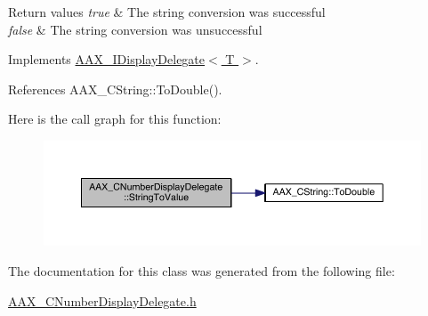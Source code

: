 \begin{DoxyRetVals}{Return values}
{\em true} & The string conversion was successful \\
\hline
{\em false} & The string conversion was unsuccessful \\
\hline
\end{DoxyRetVals}


Implements \hyperlink{a00092_aed5224775c9f733f091afddfba057d5e}{A\+A\+X\+\_\+\+I\+Display\+Delegate$<$ T $>$}.



References A\+A\+X\+\_\+\+C\+String\+::\+To\+Double().



Here is the call graph for this function\+:
\nopagebreak
\begin{figure}[H]
\begin{center}
\leavevmode
\includegraphics[width=350pt]{a00028_ad7fba7856368f7ffe4398e6efd65dfa5_cgraph}
\end{center}
\end{figure}




The documentation for this class was generated from the following file\+:\begin{DoxyCompactItemize}
\item 
\hyperlink{a00180}{A\+A\+X\+\_\+\+C\+Number\+Display\+Delegate.\+h}\end{DoxyCompactItemize}
